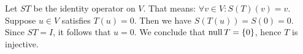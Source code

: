 \begin{xrcs}
\begin{xprf}
    \Leftarrowdirection Let $ST$ be the identity operator on $V$. That means: $\forall v \in V: S(T)(v) = v$. Suppose $u \in V$ satisfies $T(u) = 0$. Then we have $S(T(u)) = S(0) = 0$. Since $ST = I$, it follows that $u = 0$. We conclude that $\operatorname{null} T = \{0\}$, hence $T$ is injective.
  \end{xprf}
%
%
%
%
\end{xrcs}

